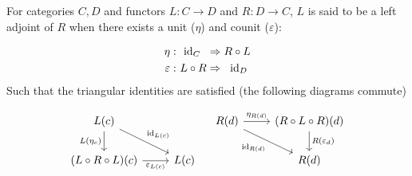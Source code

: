 \begin{definition}
  For categories $C,D$ and functors $L: C\to D$ and $R: D\to C$, $L$ is said to
  be a left adjoint of $R$ when there exists a unit ($\eta$) and counit
  ($\varepsilon$): \parencite{leinster:basic_category_theory}

  \[
    \begin{aligned}
      \eta&:\\
      \varepsilon&:
    \end{aligned}
    \ \begin{aligned}
      \mathrm{id}_C\ \:&\Rightarrow R \circ L\\
      L \circ R &\Rightarrow\ \:\mathrm{id}_D
    \end{aligned}
  \]
  Such that the triangular identities are satisfied (the following diagrams
  commute)

  \[\begin{tikzcd}[ampersand replacement=\&]
    {L(c)} \\
    {(L\circ R\circ L)(c)} \& {L(c)}
    \arrow["{L(\eta_c)}"', from=1-1, to=2-1]
    \arrow["{\varepsilon_{L(c)}}"', from=2-1, to=2-2]
    \arrow["{\id_{L(c)}}", from=1-1, to=2-2]
  \end{tikzcd}
  \quad
  \begin{tikzcd}[ampersand replacement=\&]
    {R(d)} \& {(R\circ L\circ R)(d)} \\
    \& {R(d)}
    \arrow["{\eta_{R(d)}}", from=1-1, to=1-2]
    \arrow["{R(\varepsilon_d)}", from=1-2, to=2-2]
    \arrow["{\id_{R(d)}}"', from=1-1, to=2-2]
  \end{tikzcd}\]
\end{definition}

